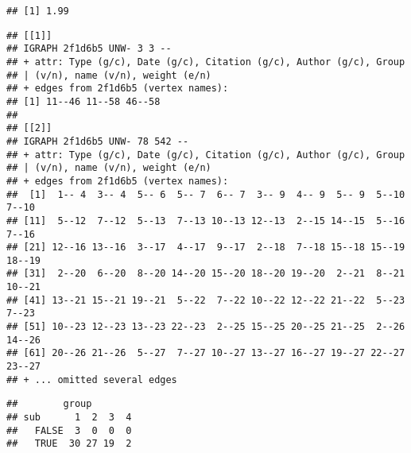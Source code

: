\documentclass[
]{article}
\newenvironment{Shaded}{\begin{snugshade}}{\end{snugshade}}
\newcommand{\CommentTok}[1]{\textcolor[rgb]{0.56,0.35,0.01}{\textit{#1}}}
\newcommand{\DataTypeTok}[1]{\textcolor[rgb]{0.13,0.29,0.53}{#1}}
\newcommand{\DecValTok}[1]{\textcolor[rgb]{0.00,0.00,0.81}{#1}}
\newcommand{\KeywordTok}[1]{\textcolor[rgb]{0.13,0.29,0.53}{\textbf{#1}}}
\newcommand{\NormalTok}[1]{#1}
\newcommand{\OperatorTok}[1]{\textcolor[rgb]{0.81,0.36,0.00}{\textbf{#1}}}
\begin{document}
\begin{verbatim}
## [1] 1.99
\end{verbatim}

\begin{Shaded}
\end{Shaded}

\begin{verbatim}
## [[1]]
## IGRAPH 2f1d6b5 UNW- 3 3 -- 
## + attr: Type (g/c), Date (g/c), Citation (g/c), Author (g/c), Group
## | (v/n), name (v/n), weight (e/n)
## + edges from 2f1d6b5 (vertex names):
## [1] 11--46 11--58 46--58
## 
## [[2]]
## IGRAPH 2f1d6b5 UNW- 78 542 -- 
## + attr: Type (g/c), Date (g/c), Citation (g/c), Author (g/c), Group
## | (v/n), name (v/n), weight (e/n)
## + edges from 2f1d6b5 (vertex names):
##  [1]  1-- 4  3-- 4  5-- 6  5-- 7  6-- 7  3-- 9  4-- 9  5-- 9  5--10  7--10
## [11]  5--12  7--12  5--13  7--13 10--13 12--13  2--15 14--15  5--16  7--16
## [21] 12--16 13--16  3--17  4--17  9--17  2--18  7--18 15--18 15--19 18--19
## [31]  2--20  6--20  8--20 14--20 15--20 18--20 19--20  2--21  8--21 10--21
## [41] 13--21 15--21 19--21  5--22  7--22 10--22 12--22 21--22  5--23  7--23
## [51] 10--23 12--23 13--23 22--23  2--25 15--25 20--25 21--25  2--26 14--26
## [61] 20--26 21--26  5--27  7--27 10--27 13--27 16--27 19--27 22--27 23--27
## + ... omitted several edges
\end{verbatim}

\begin{Shaded}
\end{Shaded}

\begin{verbatim}
##        group
## sub      1  2  3  4
##   FALSE  3  0  0  0
##   TRUE  30 27 19  2
\end{verbatim}

\begin{Shaded}
\end{Shaded}
\end{document}
